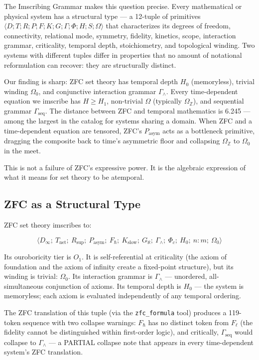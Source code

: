 \documentclass[12pt,a4paper]{article}
\begin{document}
The Imscribing Grammar makes this question precise. Every mathematical or physical system has a structural type --- a 12-tuple of primitives $\langle D; T; R; P; F; K; G; \Gamma; \Phi; H; {S}; \Omega \rangle$ that characterizes its degrees of freedom, connectivity, relational mode, symmetry, fidelity, kinetics, scope, interaction grammar, criticality, temporal depth, stoichiometry, and topological winding. Two systems with different tuples differ in properties that no amount of notational reformulation can recover: they are structurally distinct.

Our finding is sharp: ZFC set theory has temporal depth $H_0$ (memoryless), trivial winding $\Omega_0$, and conjunctive interaction grammar $\Gamma_{\wedge}$. Every time-dependent equation we imscribe has $H \geq H_1$, non-trivial $\Omega$ (typically $\Omega_\mathbb{Z}$), and sequential grammar $\Gamma_\text{seq}$. The distance between ZFC and temporal mathematics is 6.245 --- among the largest in the catalog for systems sharing a domain. When ZFC and a time-dependent equation are tensored, ZFC's $P_\text{asym}$ acts as a bottleneck primitive, dragging the composite back to time's asymmetric floor and collapsing $\Omega_\mathbb{Z}$ to $\Omega_0$ in the meet.

This is not a failure of ZFC's expressive power. It is the algebraic expression of what it means for set theory to be atemporal.

\subsection{ZFC as a Structural Type}

ZFC set theory imscribes to:

\[\langle D_{\infty};\ T_\text{net};\ R_\text{sup};\ P_\text{asym};\ F_{\hbar};\ K_\text{slow};\ G_{\aleph};\ \Gamma_{\wedge};\ \Phi_c;\ H_0;\ n{:}m;\ \Omega_0 \rangle\]

Its ouroboricity tier is $O_1$. It is self-referential at criticality (the axiom of foundation and the axiom of infinity create a fixed-point structure), but its winding is trivial: $\Omega_0$. Its interaction grammar is $\Gamma_{\wedge}$ --- unordered, all-simultaneous conjunction of axioms. Its temporal depth is $H_0$ --- the system is memoryless; each axiom is evaluated independently of any temporal ordering.

The ZFC translation of this tuple (via the \texttt{zfc\_formula} tool) produces a 119-token sequence with two collapse warnings: $F_{\hbar}$ has no distinct token from $F_{\ell}$ (the fidelity cannot be distinguished within first-order logic), and critically, $\Gamma_\text{seq}$ would collapse to $\Gamma_{\wedge}$ --- a PARTIAL collapse note that appears in every time-dependent system's ZFC translation.
\end{document}
